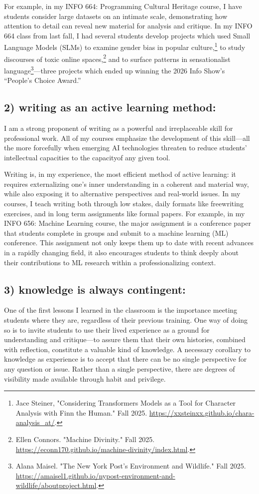 \documentclass[12pt]{article}
\begin{document}
For example, in my INFO 664: Programming Cultural Heritage course, I
have students consider large datasets on an intimate scale,
demonstrating how attention to detail can reveal new material for
analysis and critique. In my INFO 664 class from last fall, I had
several students develop projects which used Small Language Models
(SLMs) to examine gender bias in popular culture,\footnote{Jace Steiner, "Considering Transformers Models as a Tool for
Character Analysis with Finn the Human." Fall 2025.
\url{https://xxsteinxx.github.io/chara-analysis\_at/}.} to study
discourses of toxic online spaces,\footnote{Ellen Connors. "Machine Divinity." Fall 2025.
\url{https://econn170.github.io/machine-divinity/index.html}.} and to surface patterns in
sensationalist language\footnote{Alana Maisel. "The New York Post's Environment and Wildlife."
Fall 2025.
\url{https://amaisel1.github.io/nypost-environment-and-wildlife/aboutproject.html}.}---three projects which ended up winning
the 2026 Info Show's ``People's Choice Award.''

\subsection*{2) writing as an active learning method:}
\label{sec:org08c77fb}
I am a strong proponent of writing as a powerful and irreplaceable
skill for professional work. All of my courses emphasize the
development of this skill---all the more forcefully when emerging AI
technologies threaten to reduce students' intellectual capacities to
the capacityof any given tool.

Writing is, in my experience, the most efficient method of active
learning: it requires externalizing one's inner understanding in a
coherent and material way, while also exposing it to alternative
perspectives and real-world issues. In my courses, I teach writing
both through low stakes, daily formats like freewriting exercises, and
in long term assignments like formal papers. For example, in my INFO
656: Machine Learning course, the major assignment is a conference
paper that students complete in groups and submit to a machine
learning (ML) conference. This assignment not only keeps them up to
date with recent advances in a rapidly changing field, it also
encourages students to think deeply about their contributions to ML
research within a professionalizing context.

\subsection*{3) knowledge is always contingent:}
\label{sec:orgdd1ff57}
One of the first lessons I learned in the classroom is the importance
meeting students where they are, regardless of their previous
training. One way of doing so is to invite students to use their lived
experience as a ground for understanding and critique---to assure them
that their own histories, combined with reflection, constitute a
valuable kind of knowledge. A necessary corollary to knowledge as
experience is to accept that there can be no single perspective for
any question or issue. Rather than a single perspective, there are
degrees of visibility made available through habit and privilege.
\end{document}
